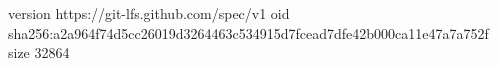 version https://git-lfs.github.com/spec/v1
oid sha256:a2a964f74d5cc26019d3264463c534915d7fcead7dfe42b000ca11e47a7a752f
size 32864

